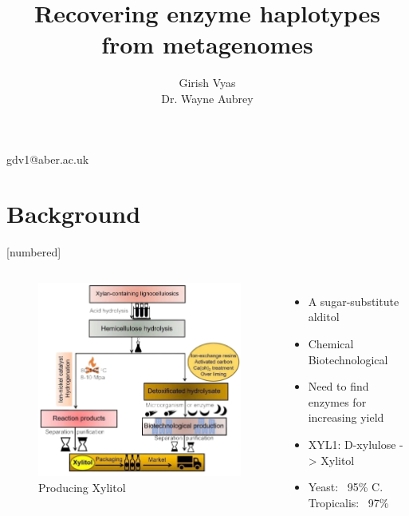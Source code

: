 \documentclass{beamer}
\title{Recovering enzyme haplotypes from metagenomes}
\author{Girish Vyas \texorpdfstring{\\}{,} Dr. Wayne Aubrey}
\institute{Aberystwyth University}
\begin{document}
\begin{frame}
	\maketitle
 gdv1@aber.ac.uk
\end{frame}

\section{Background}
[numbered]
\begin{frame}[t]
	\begin{columns}
		\begin{figure}
			\centering
			\includegraphics[width=\textwidth,height=0.4\textheight,keepaspectratio]{prod.png}
			\caption{Producing Xylitol \cite{xuBiosyntheticStrategiesProduce2019}}
		\end{figure}
		\begin{itemize}
			\item A sugar-substitute alditol
			\item Chemical  Biotechnological 
			\item Need to find enzymes for increasing yield
			\item XYL1: D-xylulose -> Xylitol
			\item Yeast: ~95\% C. Tropicalis: ~97\%
		\end{itemize}
		

\end{columns}
\end{frame}
\end{document}
